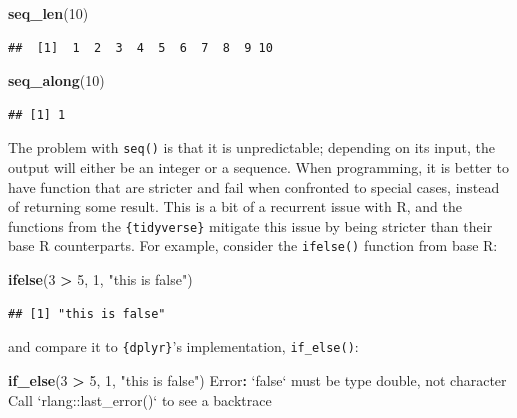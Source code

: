 \documentclass[]{gitbook}
\newenvironment{Shaded}{\begin{snugshade}}{\end{snugshade}}
\newcommand{\DataTypeTok}[1]{\textcolor[rgb]{0.13,0.29,0.53}{#1}}
\newcommand{\DecValTok}[1]{\textcolor[rgb]{0.00,0.00,0.81}{#1}}
\newcommand{\KeywordTok}[1]{\textcolor[rgb]{0.13,0.29,0.53}{\textbf{#1}}}
\newcommand{\NormalTok}[1]{#1}
\newcommand{\OperatorTok}[1]{\textcolor[rgb]{0.81,0.36,0.00}{\textbf{#1}}}
\newcommand{\StringTok}[1]{\textcolor[rgb]{0.31,0.60,0.02}{#1}}
\begin{document}
\begin{Shaded}
\begin{Highlighting}[]
\KeywordTok{seq_len}\NormalTok{(}\DecValTok{10}\NormalTok{)}
\end{Highlighting}
\end{Shaded}

\begin{verbatim}
##  [1]  1  2  3  4  5  6  7  8  9 10
\end{verbatim}

\begin{Shaded}
\begin{Highlighting}[]
\KeywordTok{seq_along}\NormalTok{(}\DecValTok{10}\NormalTok{)}
\end{Highlighting}
\end{Shaded}

\begin{verbatim}
## [1] 1
\end{verbatim}

The problem with \texttt{seq()} is that it is unpredictable; depending on its input, the output will either be an integer or a sequence.
When programming, it is better to have function that are stricter and fail when confronted to special cases, instead of returning
some result. This is a bit of a recurrent issue with R, and the functions from the \texttt{\{tidyverse\}} mitigate this issue by being
stricter than their base R counterparts. For example, consider the \texttt{ifelse()} function from base R:

\begin{Shaded}
\begin{Highlighting}[]
\KeywordTok{ifelse}\NormalTok{(}\DecValTok{3} \OperatorTok{>}\StringTok{ }\DecValTok{5}\NormalTok{, }\DecValTok{1}\NormalTok{, }\StringTok{"this is false"}\NormalTok{)}
\end{Highlighting}
\end{Shaded}

\begin{verbatim}
## [1] "this is false"
\end{verbatim}

and compare it to \texttt{\{dplyr\}}'s implementation, \texttt{if\_else()}:

\begin{Shaded}
\begin{Highlighting}[]
\KeywordTok{if_else}\NormalTok{(}\DecValTok{3} \OperatorTok{>}\StringTok{ }\DecValTok{5}\NormalTok{, }\DecValTok{1}\NormalTok{, }\StringTok{"this is false"}\NormalTok{)}
\NormalTok{Error}\OperatorTok{:}\StringTok{ `}\DataTypeTok{false}\StringTok{`}\NormalTok{ must be type double, not character}
\NormalTok{Call }\StringTok{`}\DataTypeTok{rlang::last_error()}\StringTok{`}\NormalTok{ to see a backtrace}
\end{Highlighting}
\end{Shaded}
\end{document}
